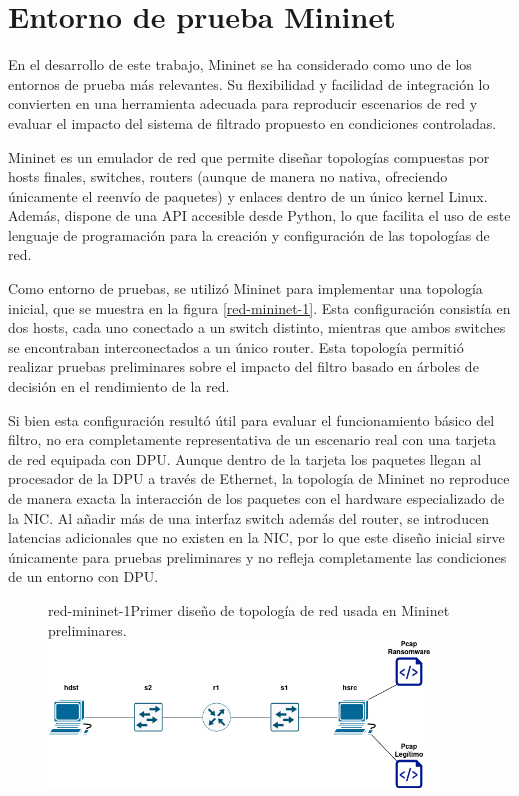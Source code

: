 \section{Entorno de prueba Mininet}

En el desarrollo de este trabajo, Mininet se ha considerado como uno de los entornos de prueba más relevantes. Su flexibilidad y facilidad de integración lo convierten en una herramienta adecuada para reproducir escenarios de red y evaluar el impacto del sistema de filtrado propuesto en condiciones controladas.

Mininet es un emulador de red que permite diseñar topologías compuestas por hosts finales, switches, routers (aunque de manera no nativa, ofreciendo únicamente el reenvío de paquetes) y enlaces dentro de un único kernel Linux. Además, dispone de una API accesible desde Python, lo que facilita el uso de este lenguaje de programación para la creación y configuración de las topologías de red\cite{lantz2021mininet}.

Como entorno de pruebas, se utilizó Mininet para implementar una topología inicial, que se muestra en la figura \ref{red-mininet-1}. Esta configuración consistía en dos hosts, cada uno conectado a un switch distinto, mientras que ambos switches se encontraban interconectados a un único router. Esta topología permitió realizar pruebas preliminares sobre el impacto del filtro basado en árboles de decisión en el rendimiento de la red.

Si bien esta configuración resultó útil para evaluar el funcionamiento básico del filtro, no era completamente representativa de un escenario real con una tarjeta de red equipada con DPU. Aunque dentro de la tarjeta los paquetes llegan al procesador de la DPU a través de Ethernet, la topología de Mininet no reproduce de manera exacta la interacción de los paquetes con el hardware especializado de la NIC. Al añadir más de una interfaz switch además del router, se introducen latencias adicionales que no existen en la NIC, por lo que este diseño inicial sirve únicamente para pruebas preliminares y no refleja completamente las condiciones de un entorno con DPU.

\begin{figure}[Primera Topología de Red]{red-mininet-1}{Primer diseño de topología de red usada en Mininet preliminares.}
	\includegraphics[width=0.9\textwidth]{capturas/DiagramaRedArbol1.png}
\end{figure}

